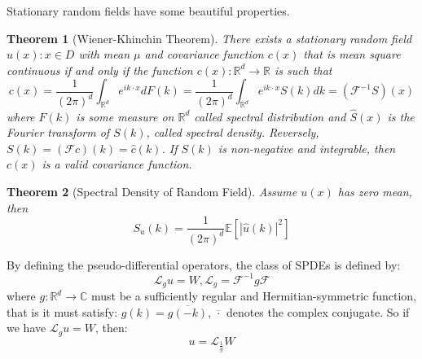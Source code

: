 \documentclass{article}
\newtheorem{theorem}{Theorem}
\begin{document}
Stationary random fields have some beautiful properties.
\begin{theorem}[Wiener-Khinchin Theorem]
    There exists a stationary random field ${u(x): x\in D}$ with mean $\mu$ and covariance function $c(x)$ that is mean square continuous if and only if 
    the function $c(x): \mathbb{R}^d\rightarrow \mathbb{R}$ is such that 
    \begin{equation}
        c(x) = \frac{1}{(2\pi)^{d}}\int_{\mathbb{R}^d} e^{ik \cdot x}dF(k)=\frac{1}{(2\pi)^{d}}\int_{\mathbb{R}^d} e^{ik \cdot x}S(k)dk = \left(\mathcal{F}^{-1}S\right)(x)
    \end{equation}
    where $F(k)$ is some measure on $\mathbb{R}^d$ called spectral distribution and $\hat{S}(x)$ is the Fourier transform of $S(k)$, 
	called spectral density.
    Reversely, $S(k) = \left(\mathcal{F}c\right)(k) = \hat{c}(k)$.
    If $S(k)$ is non-negative and integrable, then $c(x)$ is a valid covariance function.
\end{theorem}

\begin{theorem}[Spectral Density of Random Field]\label{spectral_density_random_field}
	Assume $u(x)$ has zero mean, then 
\begin{equation}\label{spectraldensity}
	S_u(k)=\frac{1}{(2\pi)^{d}}\mathbb{E}[|\hat{u}(k)|^2]
\end{equation}
\end{theorem}




By defining the pseudo-differential operators, the class of SPDEs is defined by:
\begin{equation}
	\mathcal{L}_gu = W, \mathcal{L}_g = \mathcal{F}^{-1}g\mathcal{F}
\end{equation}
where $g:\mathbb{R}^d\rightarrow \mathbb{C}$ must be a sufficiently regular and Hermitian-symmetric function, that is it must satisfy: $g(k) = \overline{g(-k)}$, $\overline{\cdot}$ denotes the complex conjugate.
So if we have $\mathcal{L}_gu = W$, then:
\begin{equation}
	u=\mathcal{L}_{\frac{1}{g}}W
\end{equation}
\end{document}
